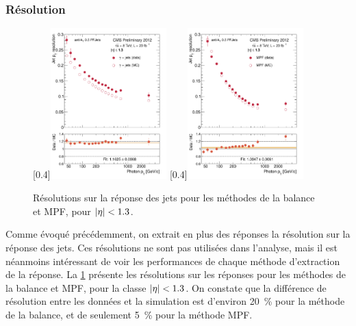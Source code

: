 \subsubsection{Résolution}

\begin{figure}[tbp] \centering
    [0.4\textwidth]{\includegraphics[width=0.4\textwidth]{chapitre4/figs/reso_balancing/resolution_eta013_balancing.pdf}} \qquad
    [0.4\textwidth]{\includegraphics[width=0.4\textwidth]{chapitre4/figs/reso_mpf/resolution_eta013_mpf.pdf}}
    \caption{Résolutions sur la réponse des jets pour les méthodes de la balance et MPF, pour $\lvert \eta \rvert < \num{1.3}$.}
    \label{fig:resolutions}
\end{figure}

Comme évoqué précédemment, on extrait en plus des réponses la résolution sur la réponse des jets. Ces résolutions ne sont pas utilisées dans l'analyse, mais il est néanmoins intéressant de voir les performances de chaque méthode d'extraction de la réponse. La \cref{fig:resolutions} présente les résolutions sur les réponses pour les méthodes de la balance et MPF, pour la classe $\lvert \eta \rvert < \num{1.3}$. On constate que la différence de résolution entre les données et la simulation est d'environ \SI{20}{\percent} pour la méthode de la balance, et de seulement \tilde\SI{5}{\percent} pour la méthode MPF.

